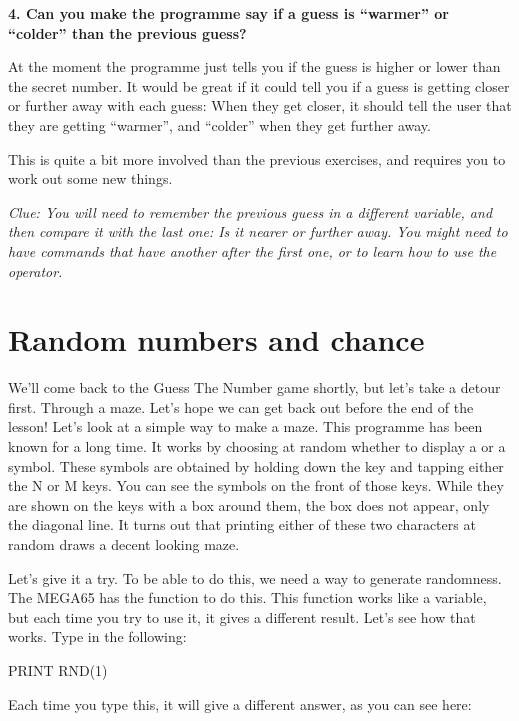 {\bf 4. Can you make the programme say if a guess is ``warmer'' or ``colder'' than the previous guess?}

At the moment the programme just tells you if the guess is higher or
lower than the secret number.  It would be great if it could tell you
if a guess is getting closer or further away with each guess: When
they get closer, it should tell the user that they are getting ``warmer'',
and ``colder'' when they get further away.

This is quite a bit more involved than the previous exercises, and
requires you to work out some new things.

{\em Clue: You will need to remember the previous guess in a different
  variable, and then compare it with the last one: Is it nearer or
  further away. You might need to have  commands that have
  another  after the first one, or to learn how to use the
   operator.}

\section{Random numbers and chance}

We'll come back to the Guess The Number game shortly, but let's take a
detour first. Through a maze. Let's hope we can get back out before
the end of the lesson!  Let's look at a simple way to make a
maze. This programme has been known for a long time.  It works by
choosing at random whether to display a {} or a
{} symbol.  These symbols are obtained by holding down
the  key and tapping either the N or M keys.  You
can see the symbols on the front of those keys.  While they are shown
on the keys with a box around them, the box does not appear, only the
diagonal line.  It turns out that printing either of these two
characters at random draws a decent looking maze.

\needspace{4cm}
Let's give it a try.  To be able to do this, we need a way to generate
randomness.  The MEGA65 has the  function to do this.  This
function works like a variable, but each time you try to use it, it
gives a different result.  Let's see how that works.  Type in the
following:

\begin{screenoutput}
PRINT RND(1)
\end{screenoutput}

Each time you type this, it will give a different answer, as you can
see here:

